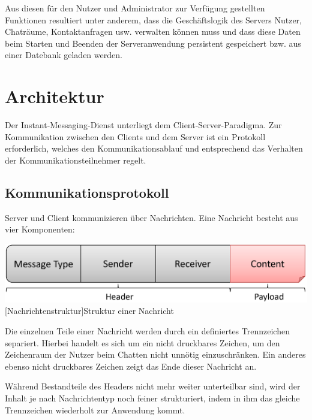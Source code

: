 \documentclass[12pt,a4paper,bibliography=totocnumbered,listof=totocnumbered]{scrartcl}
\begin{document}
Aus diesen für den Nutzer und Administrator zur Verfügung gestellten Funktionen resultiert unter anderem, dass die Geschäftslogik des Servers Nutzer, Chaträume, Kontaktanfragen usw. verwalten können muss und dass diese Daten beim Starten und Beenden der Serveranwendung persistent gespeichert bzw. aus einer Datebank geladen werden.

\section{Architektur}
Der Instant-Messaging-Dienst unterliegt dem Client-Server-Paradigma. Zur Kommunikation zwischen den Clients und dem Server ist ein Protokoll erforderlich, welches den Kommunikationsablauf und entsprechend das Verhalten der Kommunikationsteilnehmer regelt.

\subsection{Kommunikationsprotokoll}
Server und Client kommunizieren über Nachrichten. Eine Nachricht besteht aus vier Komponenten:

\vspace{1em}
\begin{minipage}{\linewidth}
	\centering
	\includegraphics[width=0.7\linewidth]{img/Nachrichtenstruktur.png}
	[Nachrichtenstruktur]{Struktur einer Nachricht}
	\label{fig:Nachrichtenstruktur}
\end{minipage}
\vspace{0.5em}

Die einzelnen Teile einer Nachricht werden durch ein definiertes Trennzeichen separiert. Hierbei handelt es sich um ein nicht druckbares Zeichen, um den Zeichenraum der Nutzer beim Chatten nicht unnötig einzuschränken. Ein anderes ebenso nicht druckbares Zeichen zeigt das Ende dieser Nachricht an.

Während Bestandteile des Headers nicht mehr weiter unterteilbar sind, wird der Inhalt je nach Nachrichtentyp noch feiner strukturiert, indem in ihm das gleiche Trennzeichen wiederholt zur Anwendung kommt.
\end{document}
